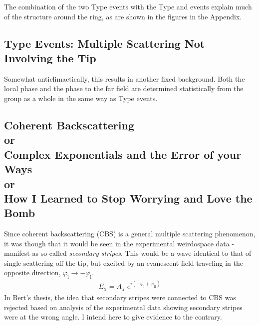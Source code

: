 The combination of the two Type  events with the Type 
and  events explain much of the structure around the ring, as are
shown in the figures in the Appendix.

\subsection{Type  Events: Multiple Scattering Not Involving the Tip}
Somewhat anticlimactically, this results in another fixed background.  Both
the local phase and the phase to the far field are determined statistically
from the group as a whole in the same way as Type  events.

\subsection{Coherent Backscattering\\{\normalsize or}\\
Complex Exponentials and the Error of your Ways
\\{\normalsize or}\\
How I Learned to Stop Worrying and Love the Bomb
}
Since coherent backscattering (CBS) is a general multiple scattering
phenomenon, it was though that it would be seen in the experimental
weirdospace data - manifest as so called {\it secondary stripes}.  This
would be a wave identical to that of single scattering off the tip, but
excited by an evanescent field traveling in the opposite direction,
$\varphi_{\mathrm{l}}\to-\varphi_{\mathrm{l}}$.
\begin{align}
  E_\mathrm{\chi}=A_\chi\;e^{i (-\varphi_{\mathrm{l}}+\varphi_{\mathrm{ff}})}
  \label{eqn:cbs}
\end{align}
In Bert's thesis, the idea that secondary stripes were connected to CBS was
rejected based on analysis of the experimental data showing secondary
stripes were at the wrong angle.  I intend here to give evidence to the
contrary.


